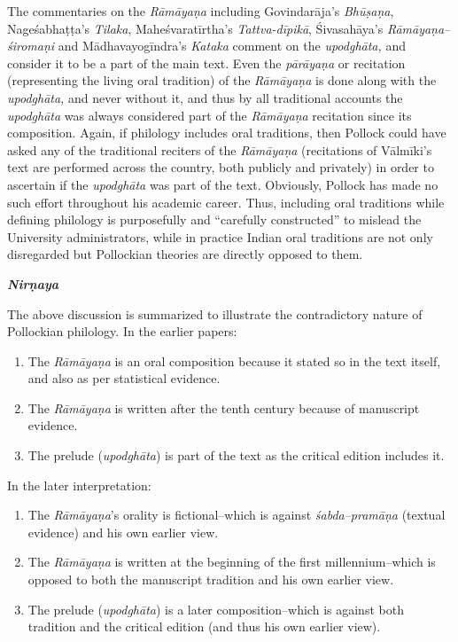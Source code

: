 The commentaries on the\textit{ Rāmāyaṇa} including Govindarāja’s \textit{Bhūṣaṇa}, Nageśabhaṭṭa’s \textit{Tilaka}, Maheśvaratīrtha’s \textit{Tattva-dīpikā}, Śivasahāya’s \textit{Rāmāyaṇa–śiromaṇi} and Mādhavayogīndra’s \textit{Kataka }comment on the \textit{upodghāta, }and consider it to be a part of the main text. Even the \textit{pārāyaṇa} or recitation (representing the living oral tradition) of the \textit{Rāmāyaṇa} is done along with the \textit{upodghāta, }and never without it, and thus by all traditional accounts the \textit{upodghāta }was always considered part of the \textit{Rāmāyaṇa }recitation since its composition. Again, if philology includes oral traditions, then Pollock could have asked any of the traditional reciters of the \textit{Rāmāyaṇa }(recitations of Vālmīki’s text are performed across the country, both publicly and privately) in order to ascertain if the\textit{ upodghāta }was part of the text. Obviously, Pollock has made no such effort throughout his academic career. Thus, including oral traditions while defining philology is purposefully and “carefully constructed” to mislead the University administrators, while in practice Indian oral traditions are not only disregarded but Pollockian theories are directly opposed to them.

\textit{\textbf{Nirṇaya}}

The above discussion is summarized to illustrate the contradictory nature of Pollockian philology. In the earlier papers:

\begin{enumerate}
\itemsep=0pt
\item The \textit{Rāmāyaṇa }is an oral composition because it stated so in the text itself, and also as per statistical evidence.

 \item The \textit{Rāmāyaṇa }is written after the tenth century because of manuscript evidence.

 \item The prelude (\textit{upodghāta}) is part of the text as the critical edition includes it.

\end{enumerate}

In the later interpretation:

\begin{enumerate}
\itemsep=0pt
\item The \textit{Rāmāyaṇa}’s orality is fictional–which is against \textit{śabda–pramāṇa} (textual evidence) and his own earlier view.

 \item The \textit{Rāmāyaṇa }is written at the beginning of the first millennium–which is opposed to both the manuscript tradition and his own earlier view.

 \item The prelude (\textit{upodghāta}) is a later composition–which is against both tradition and the critical edition (and thus his own earlier view).

\end{enumerate}

